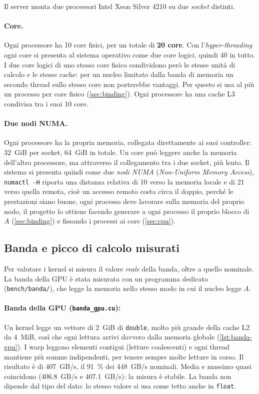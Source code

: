 \documentclass[11pt,a4paper]{article}
\begin{document}
Il server monta due processori Intel Xeon Silver 4210 su due \emph{socket} distinti.

\paragraph{Core.} Ogni processore ha 10 core fisici, per un totale di
\textbf{20 core}. Con l'\emph{hyper-threading} ogni core si presenta al sistema
operativo come due core logici, quindi 40 in tutto. I due core logici di uno stesso core
fisico condividono però le stesse unità di calcolo e le stesse cache: per un
nucleo limitato dalla banda di memoria un secondo thread sullo stesso core non
porterebbe vantaggi. Per questo si usa al più un processo per core fisico
(\cref{sec:binding}). Ogni processore ha una cache L3 condivisa tra i suoi 10 core.

\paragraph{Due nodi NUMA.} Ogni processore ha la propria memoria, collegata
direttamente ai suoi controller: \SI{32}{GiB} per socket, \SI{64}{GiB} in
totale. Un core può leggere anche la memoria dell'altro processore, ma
attraverso il collegamento tra i due socket, più lento. Il sistema si presenta
quindi come due \emph{nodi NUMA} (\emph{Non-Uniform Memory Access}),
\texttt{numactl -H} riporta una distanza relativa di 10 verso la memoria locale e
di 21 verso quella remota, cioè un accesso remoto costa circa il doppio,
perché le prestazioni siano buone, ogni processo deve lavorare sulla memoria
del proprio nodo, il progetto lo ottiene facendo generare a ogni processo il
proprio blocco di $A$ (\cref{sec:binding}) e fissando i
processi ai core (\cref{sec:cpu}).

\subsection{Banda e picco di calcolo misurati}\label{sec:banda}

Per valutare i kernel si misura il valore \emph{reale} della banda, oltre a quello nominale. La banda della GPU è stata misurata
con un programma dedicato (\texttt{bench/banda/}), che legge la memoria
nello stesso modo in cui il nucleo legge $A$.

\paragraph{Banda della GPU (\texttt{banda\_gpu.cu}):} Un kernel legge un vettore di \SI{2}{GiB} di \texttt{double},
molto più grande della cache L2 da \SI{4}{MiB}, così che ogni lettura arrivi
davvero dalla memoria globale (\cref{lst:banda-gpu}). I warp leggono elementi contigui (letture
coalescenti) e ogni thread mantiene più somme indipendenti, per tenere sempre
molte letture in corso. Il risultato è di \SI{407}{GB/s}, il \SI{91}{\percent}
dei \SI{448}{GB/s} nominali. Media e massimo quasi coincidono
(\SI{406.8}{GB/s} e \SI{407.1}{GB/s}): la misura è stabile. La banda non dipende
dal tipo del dato: lo stesso valore si usa come tetto anche in \texttt{float}.
\end{document}
